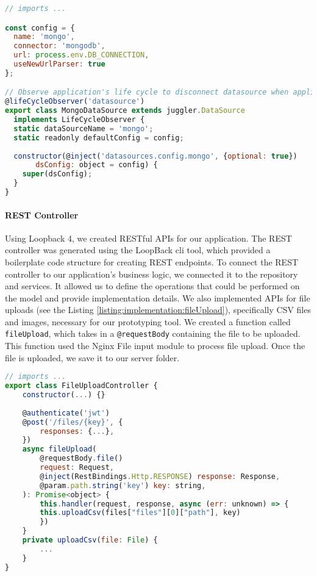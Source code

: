 \begin{lstlisting}[language=JavaScript, caption=The Typescript File for the MongoDB Datasource, label=listing:implementation:lb4Mongo]
// imports ...

const config = {
  name: 'mongo',
  connector: 'mongodb',
  url: process.env.DB_CONNECTION,
  useNewUrlParser: true
};

// Observe application's life cycle to disconnect datasource when application is stopped
@lifeCycleObserver('datasource')
export class MongoDataSource extends juggler.DataSource
  implements LifeCycleObserver {
  static dataSourceName = 'mongo';
  static readonly defaultConfig = config;
    
  constructor(@inject('datasources.config.mongo', {optional: true})
       dsConfig: object = config) {
    super(dsConfig);
  }
}
\end{lstlisting}

\paragraph{REST Controller}
Using Loopback 4, we created RESTful APIs for our application. 
The REST controller was generated using the LoopBack \ac{cli} tool, which provided a boilerplate code structure for creating REST endpoints.
To connect the REST controller to our application's business logic, we connected it to the repository and services. 
It allowed us to define the operations that could be performed on the model and provide implementation details.
We also implemented APIs for file uploads (see the Listing \ref{listing:implementation:fileUpload}), specifically CSV files and images, necessary for our prototyping tool. 
We created a function called \texttt{fileUpload}, which takes in a \texttt{@requestBody} containing the file to be uploaded. 
This function used the Nginx File input module to process file upload. 
Once the file is uploaded, we save it to our server folder.

\begin{lstlisting}[language=JavaScript, caption=The Typescript File for the Rest Controller for File Upload, label=listing:implementation:fileUpload]
// imports ...
export class FileUploadController {
    constructor(...) {}
    
    @authenticate('jwt')
    @post('/files/{key}', {
        responses: {...},
    })
    async fileUpload(
        @requestBody.file()
        request: Request,
        @inject(RestBindings.Http.RESPONSE) response: Response,
        @param.path.string('key') key: string,
    ): Promise<object> {
        this.handler(request, response, async (err: unknown) => {
        this.uploadCsv(files["files"][0]["path"], key)
        })
    }
    private uploadCsv(file: File) {
        ...
    }
}
\end{lstlisting}

